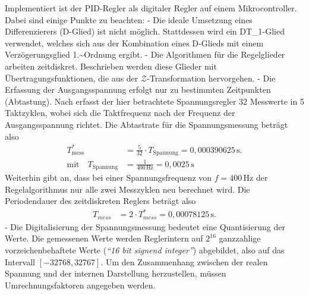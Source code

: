 Implementiert ist der PID-Regler als digitaler Regler auf einem
Mikrocontroller. Dabei sind einige Punkte zu beachten: - Die ideale
Umsetzung eines Differenzierers (D-Glied) ist nicht möglich. Stattdessen
wird ein DT\_1-Glied verwendet, welches sich aus der Kombination eines
D-Glieds mit einem Verzögerungsglied 1.\textasciitilde Ordnung ergibt. -
Die Algorithmen für die Regelglieder arbeiten zeitdiskret. Beschrieben
werden diese Glieder mit Übertragungsfunktionen, die aus der
\(\mathcal{Z}\)-Transformation hervorgehen. - Die Erfassung der
Ausgangsspannung erfolgt nur zu bestimmten Zeitpunkten (Abtastung). Nach
\cite{ @DigitalerSpannungsreglerSoftwaredokumentation } erfasst der hier
betrachtete Spannungsregler 32 Messwerte in 5 Taktzyklen, wobei sich die
Taktfrequenz nach der Frequenz der Ausgangsspannung richtet. Die
Abtastrate für die Spannungsmessung beträgt also
  \begin{align}
  T_{\mathrm{mess}}^*&= \frac{5}{32}\cdot T_{\mathrm{Spannung}} = 0,000390625\,\mathrm s. \\
  \text{mit} \quad
  T_{\mathrm{Spannung}}&= \frac{1}{400\,\mathrm{Hz}}=0,0025\,\mathrm s
  \end{align}
  Weiterhin gibt \cite{ @DigitalerSpannungsreglerSoftwaredokumentation }
an, dass bei einer Spannungsfrequenz von \(f=400\,\mathrm{Hz}\) der
Regelalgorithmus nur alle zwei Messzyklen neu berechnet wird. Die
Periodendauer des zeitdiskreten Reglers beträgt also
  \begin{align}
  T_{mess}&=2\cdot T_{mess}^*= 0,00078125\,\mathrm s.
  \end{align} - Die Digitalisierung der Spannungsmessung bedeutet eine
Quantisierung der Werte. Die gemessenen Werte werden Reglerintern auf
\(2^{16}\) ganzzahlige vorzeichenbehaftete Werte (\emph{``16 bit signend
integer''}) abgebildet, also auf das Intervall \([-32768,32767]\). Um
den Zusammenhang zwischen der realen Spannung und der internen
Darstellung herzustellen, müssen Umrechnungsfaktoren angegeben werden.
